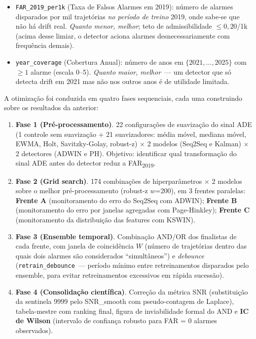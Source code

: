 \documentclass[11pt,a4paper]{article}
\begin{document}
\begin{itemize}[leftmargin=1.4em,itemsep=2pt]
    \item \texttt{FAR\_2019\_per1k} (Taxa de Falsos Alarmes em 2019): n\'umero de alarmes disparados por mil trajet\'orias \emph{no per\'iodo de treino} 2019, onde sabe-se que n\~ao h\'a drift real. \emph{Quanto menor, melhor}; teto de admissibilidade $\leq\!0{,}20$/1k (acima desse limiar, o detector aciona alarmes desnecessariamente com frequ\^encia demais).
    \item \texttt{year\_coverage} (Cobertura Anual): n\'umero de anos em $\{2021,\dots,2025\}$ com $\geq\!1$ alarme (escala 0--5). \emph{Quanto maior, melhor}~--- um detector que s\'o detecta drift em 2021 mas n\~ao nos outros anos \'e de utilidade limitada.
\end{itemize}

A otimiza\c{c}\~ao foi conduzida em quatro fases sequenciais, cada uma construindo sobre os resultados da anterior:

\begin{enumerate}[leftmargin=1.6em,itemsep=2pt]
    \item \textbf{Fase 1 (Pr\'e-processamento)}. 22 configura\c{c}\~oes de suaviza\c{c}\~ao do sinal ADE (1 controle sem suaviza\c{c}\~ao + 21 suavizadores: m\'edia m\'ovel, mediana m\'ovel, EWMA, Holt, Savitzky-Golay, robust-z) $\times$ 2 modelos (Seq2Seq e Kalman) $\times$ 2 detectores (ADWIN e PH). Objetivo: identificar qual transforma\c{c}\~ao do sinal ADE antes do detector reduz a FAR\textsubscript{2019}.
    \item \textbf{Fase 2 (Grid search)}. 174 combina\c{c}\~oes de hiperpar\^ametros $\times$ 2 modelos sobre o melhor pr\'e-processamento (robust-z $w$=200), em 3 frentes paralelas: \textbf{Frente A} (monitoramento do erro do Seq2Seq com ADWIN); \textbf{Frente B} (monitoramento do erro por janelas agregadas com Page-Hinkley); \textbf{Frente C} (monitoramento da distribui\c{c}\~ao das features com KSWIN).
    \item \textbf{Fase 3 (Ensemble temporal)}. Combina\c{c}\~ao AND/OR dos finalistas de cada frente, com janela de coincid\^encia $W$ (n\'umero de trajet\'orias dentro das quais dois alarmes s\~ao considerados ``simult\^aneos'') e \emph{debounce} (\texttt{retrain\_debounce}~--- per\'iodo m\'inimo entre retreinamentos disparados pelo ensemble, para evitar retreinamentos excessivos em r\'apida sucess\~ao).
    \item \textbf{Fase 4 (Consolida\c{c}\~ao cient\'ifica)}. Corre\c{c}\~ao da m\'etrica SNR (substitui\c{c}\~ao da sentinela 9999 pelo SNR\_smooth com pseudo-contagem de Laplace), tabela-mestre com ranking final, figura de inviabilidade formal do AND e \textbf{IC de Wilson} (intervalo de confian\c{c}a robusto para FAR = 0 alarmes observados).
\end{enumerate}
\end{document}
